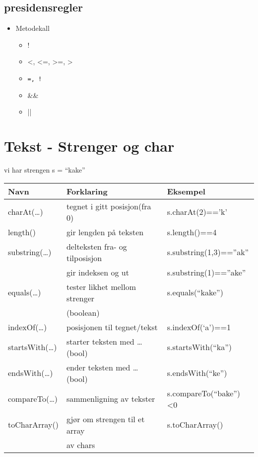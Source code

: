 \documentclass[11pt]{article}
\begin{document}
\subsection{presidensregler}
\label{sec-2_1}


\begin{itemize}
\item Metodekall

\begin{itemize}
\item !
\item <, <=, >=, >
\item \texttt{=, !}
\item \&\&
\item ||
\end{itemize}

\end{itemize}
\section{Tekst - Strenger og char}
\label{sec-3}


  vi har strengen s = ``kake''
  

\begin{center}
\begin{tabular}{lll}
\hline
 Navn                  &  Forklaring                           &  Eksempel                  \\
\hline
 charAt(\ldots{})      &  tegnet i gitt posisjon(fra 0)        &  s.charAt(2)=='k'          \\
\hline
 length()              &  gir lengden på teksten               &  s.length()==4             \\
\hline
 substring(\ldots{})   &  delteksten fra- og tilposisjon       &  s.substring(1,3)==''ak''  \\
                       &  gir indeksen og ut                   &  s.substring(1)==''ake''   \\
\hline
 equals(\ldots{})      &  tester likhet mellom strenger        &  s.equals(``kake'')        \\
                       &  (boolean)                            &                            \\
\hline
 indexOf(\ldots{})     &  posisjonen til tegnet/tekst          &  s.indexOf(`a')==1         \\
\hline
 startsWith(\ldots{})  &  starter teksten med \ldots{} (bool)  &  s.startsWith(``ka'')      \\
\hline
 endsWith(\ldots{})    &  ender teksten med \ldots{} (bool)    &  s.endsWith(``ke'')        \\
\hline
 compareTo(\ldots{})   &  sammenligning av tekster             &  s.compareTo(``bake'')<0   \\
\hline
 toCharArray()         &  gjør om strengen til et array        &  s.toCharArray()           \\
                       &  av chars                             &                            \\
\hline
\end{tabular}
\end{center}
\end{document}
